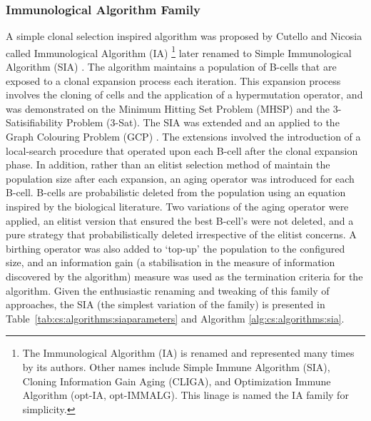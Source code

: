 %
%
\subsubsection{Immunological Algorithm Family}
\label{subsubsec::cs:taxonomy:ia}
A simple clonal selection inspired algorithm was proposed by Cutello and Nicosia called Immunological Algorithm (IA) \cite{Cutello2002a, Cutello2002}\footnote{The Immunological Algorithm (IA) is renamed and represented many times by its authors. Other names include Simple Immune Algorithm (SIA), Cloning Information Gain Aging (CLIGA), and Optimization Immune Algorithm (opt-IA, opt-IMMALG). This linage is named the IA family for simplicity.} later renamed to Simple Immunological Algorithm (SIA) \cite{Cutello2005b}. The algorithm maintains a population of B-cells that are exposed to a clonal expansion process each iteration. This expansion process involves the cloning of cells and the application of a hypermutation operator, and was demonstrated on the Minimum Hitting Set Problem (MHSP) and the 3-Satisifiability Problem (3-Sat). The SIA was extended and an applied to the Graph Colouring Problem (GCP) \cite{Cutello2003}. The extensions involved the introduction of a local-search procedure that operated upon each B-cell after the clonal expansion phase. In addition, rather than an elitist selection method of maintain the population size after each expansion, an aging operator was introduced for each B-cell. B-cells are probabilistic deleted from the population using an equation inspired by the biological literature. Two variations of the aging operator were applied, an elitist version that ensured the best B-cell's were not deleted, and a pure strategy that probabilistically deleted irrespective of the elitist concerns. A birthing operator was also added to `top-up' the population to the configured size, and an information gain (a stabilisation in the measure of information discovered by the algorithm) measure was used as the termination criteria for the algorithm. Given the enthusiastic renaming and tweaking of this family of approaches, the SIA (the simplest variation of the family) is presented in Table~\ref{tab:cs:algorithms:siaparameters} and Algorithm \ref{alg:cs:algorithms:sia}.

